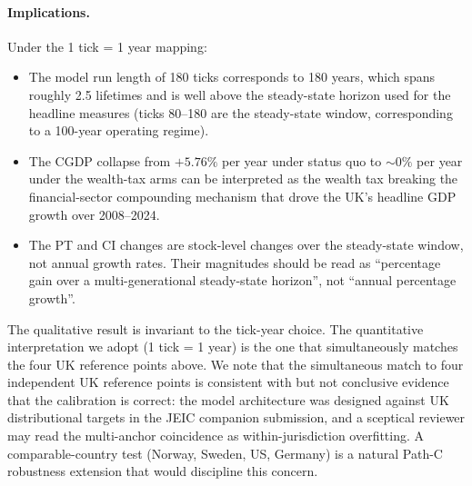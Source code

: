 \documentclass[11pt]{article}
\begin{document}
\paragraph{Implications.}  Under the 1 tick = 1 year mapping:
\begin{itemize}
\item The model run length of 180 ticks corresponds to 180 years,
which spans roughly 2.5 lifetimes and is well above the steady-state
horizon used for the headline measures (ticks 80--180 are the
steady-state window, corresponding to a 100-year operating regime).
\item The CGDP collapse from $+5.76\%$ per year under status quo to
$\sim 0\%$ per year under the wealth-tax arms can be interpreted as
the wealth tax breaking the financial-sector compounding mechanism
that drove the UK's headline GDP growth over 2008--2024.
\item The PT and CI changes are stock-level changes over the
steady-state window, not annual growth rates.  Their magnitudes
should be read as ``percentage gain over a multi-generational
steady-state horizon'', not ``annual percentage growth''.
\end{itemize}

The qualitative result is invariant to the tick-year choice.  The
quantitative interpretation we adopt (1 tick = 1 year) is the one
that simultaneously matches the four UK reference points above.  We
note that the simultaneous match to four independent UK reference
points is consistent with but not conclusive evidence that the
calibration is correct: the model architecture was designed against
UK distributional targets in the JEIC companion submission, and a
sceptical reviewer may read the multi-anchor coincidence as
within-jurisdiction overfitting.  A comparable-country test
(Norway, Sweden, US, Germany) is a natural Path-C robustness
extension that would discipline this concern.
\end{document}
